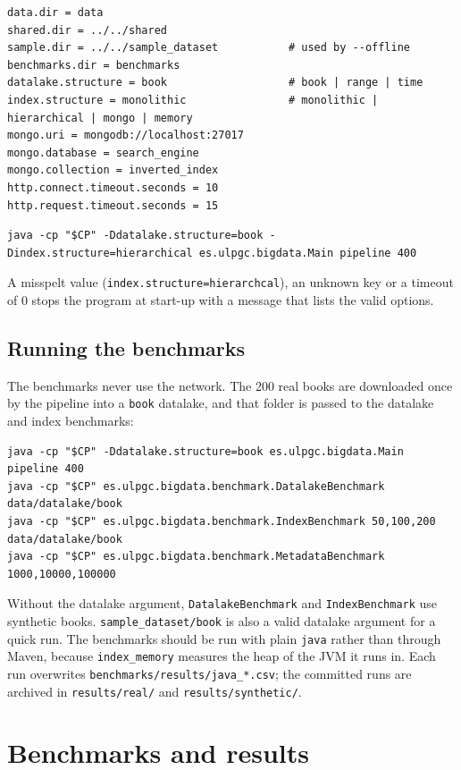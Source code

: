 \documentclass[11pt,a4paper]{article}
\newcommand{\code}[1]{\texttt{#1}}
\begin{document}
\begin{lstlisting}[style=shell]
data.dir = data
shared.dir = ../../shared
sample.dir = ../../sample_dataset           # used by --offline
benchmarks.dir = benchmarks
datalake.structure = book                   # book | range | time
index.structure = monolithic                # monolithic | hierarchical | mongo | memory
mongo.uri = mongodb://localhost:27017
mongo.database = search_engine
mongo.collection = inverted_index
http.connect.timeout.seconds = 10
http.request.timeout.seconds = 15
\end{lstlisting}
\begin{lstlisting}[style=shell]
java -cp "$CP" -Ddatalake.structure=book -Dindex.structure=hierarchical es.ulpgc.bigdata.Main pipeline 400
\end{lstlisting}
A misspelt value (\code{index.structure=hierarchcal}), an unknown key or a timeout of 0 stops the
program at start-up with a message that lists the valid options.

\subsection{Running the benchmarks}
The benchmarks never use the network. The 200 real books are downloaded once by the pipeline into a
\code{book} datalake, and that folder is passed to the datalake and index benchmarks:
\begin{lstlisting}[style=shell]
java -cp "$CP" -Ddatalake.structure=book es.ulpgc.bigdata.Main pipeline 400
java -cp "$CP" es.ulpgc.bigdata.benchmark.DatalakeBenchmark data/datalake/book
java -cp "$CP" es.ulpgc.bigdata.benchmark.IndexBenchmark 50,100,200 data/datalake/book
java -cp "$CP" es.ulpgc.bigdata.benchmark.MetadataBenchmark 1000,10000,100000
\end{lstlisting}
Without the datalake argument, \code{DatalakeBenchmark} and \code{IndexBenchmark} use synthetic
books. \code{sample\_dataset/book} is also a valid datalake argument for a quick run. The
benchmarks should be run with plain \code{java} rather than through Maven, because
\code{index\_memory} measures the heap of the JVM it runs in. Each run overwrites
\code{benchmarks/results/java\_*.csv}; the committed runs are archived in \code{results/real/} and
\code{results/synthetic/}.

\section{Benchmarks and results}\label{sec:bench}
\end{document}
